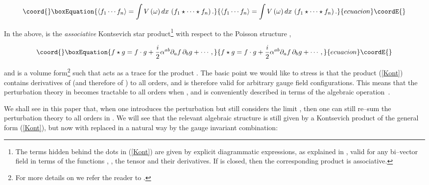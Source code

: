 \documentclass[a4paper,11pt]{article}
\begin{document}
\begin{equation}\coord{}\boxEquation{
\langle f_{1} \cdots f_{n} \rangle = \int V\left( \omega \right) dx\, 
\left( f_{1} \star \cdots \star f_{n}\right) .
\label{nptfct}
}{
\langle f_{1} \cdots f_{n} \rangle = \int V\left( \omega \right) dx\, 
\left( f_{1} \star \cdots \star f_{n}\right) .
}{ecuacion}\coordE{}\end{equation}

\noindent
In the above, \myHighlight{$\star$}\coordHE{} is the \textit{associative} Kontsevich star 
product\footnote{The terms hidden behind the dots \myHighlight{$\cdots$}\coordHE{} in (\ref{Kont}) are 
given by explicit diagrammatic expressions, as explained in \cite{Kontsevich}, 
valid for any bi--vector field \coordHE{} in terms of the 
functions \coordHE{}, \coordHE{}, the tensor \coordHE{} and their derivatives. If 
\coordHE{} is closed, then the corresponding product is associative.} 
with respect to the Poisson structure \coordHE{},

\begin{equation}\coord{}\boxEquation{
f\star g=f\cdot g+\frac{i}{2}\alpha ^{ab}\partial _{a}f\,\partial
_{b}g+\cdots ,  \label{Kont}
}{
f\star g=f\cdot g+\frac{i}{2}\alpha ^{ab}\partial _{a}f\,\partial
_{b}g+\cdots ,  }{ecuacion}\coordE{}\end{equation}

\noindent
and \coordHE{} is a volume form\footnote{For more details on \coordHE{} we refer the reader to \cite{Cornalba-3}.} such that 
\coordHE{} acts as a trace for the product 
\myHighlight{$\star$}\coordHE{}. The basic point we would like to stress is that the product 
(\ref{Kont}) contains derivatives of \myHighlight{$\alpha$}\coordHE{} (and therefore of \coordHE{}) 
to all orders, and is therefore valid for arbitrary gauge field 
configurations. This means that the perturbation theory in \coordHE{} becomes 
tractable to all orders when \coordHE{}, and is conveniently 
described in terms of the algebraic operation~\myHighlight{$\star$}\coordHE{}.

We shall see in this paper that, when one introduces the perturbation 
\coordHE{} but still considers the limit \coordHE{}, then one can still
re--sum the perturbation theory to all orders in \coordHE{}. We will see that the
relevant algebraic structure is still given by a Kontsevich product of the
general form (\ref{Kont}), but now with \myHighlight{$\omega$}\coordHE{} replaced in a natural
way by the gauge invariant combination:
\end{document}
